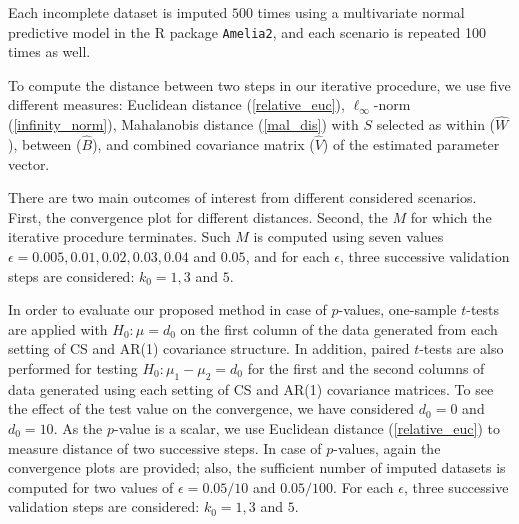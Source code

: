 \documentclass[11pt,a5paper,twoside]{book}
\begin{document}
{{Each incomplete dataset is imputed $500$ times using a multivariate normal predictive model in the \textsc{R} package {\tt{Amelia2}}, and each scenario is repeated 100 times as well.

%



To compute the distance between two steps in our iterative procedure, we use five different measures: Euclidean distance (\ref{relative_euc}), $\ell_{\infty}$-norm (\ref{infinity_norm}), Mahalanobis distance (\ref{mal_dis}) with $S$ selected as within ($\widehat{W}$), between ($\widehat{B}$), and combined covariance matrix ($\widehat{V}$) of the estimated parameter vector. 


There are two main outcomes of interest from different considered scenarios. First, the convergence plot for different distances. Second, the $M$ for which the iterative procedure terminates. Such $M$ is computed using seven values $\epsilon= 0.005, 0.01, 0.02, 0.03, 0.04$ and $0.05$, and for each $\epsilon$, three successive validation steps are considered: $k_0=1,3$ and $5$. 


In order to evaluate our proposed method in case of $p$-values, one-sample $t$-tests are applied with $H_0:\mu=d_0$ on the first column of the data generated from each setting of CS and AR(1) covariance structure. In addition, paired $t$-tests are also performed for testing $H_0:\mu_1-\mu_2=d_0$ for the first and the second columns of data generated using each setting of CS and AR(1) covariance matrices. To see the effect of the test value on the convergence, we have considered $d_0=0$ and $d_0=10$. As the $p$-value is a scalar, we use Euclidean distance (\ref{relative_euc}) to measure distance of two successive steps. In case of $p$-values, again the convergence plots are provided; also, the sufficient number of imputed datasets is computed for two values of $\epsilon=0.05/10$ and $0.05/100$. For each $\epsilon$, three successive validation steps are considered: $k_0=1,3$ and $5$. 

}}
\end{document}

